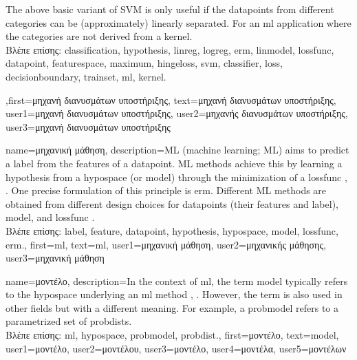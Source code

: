 {{\begin{figure}[H]
\begin{center}
				\label{fig_svm_gls_dict}
			\end{center}
		\end{figure}
		The above basic variant of SVM is only useful if the \gls{datapoint}s from different categories can be  
		(approximately) linearly separated. For an \gls{ml} application where the categories are not 
		derived from a \gls{kernel}.\\
		\foreignlanguage{greek}{Βλέπε επίσης:} \gls{classification}, \gls{hypothesis}, \gls{linreg}, \gls{logreg}, \gls{erm}, \gls{linmodel}, \gls{lossfunc}, \gls{datapoint}, \gls{featurespace}, \gls{maximum}, \gls{hingeloss}, \gls{svm}, \gls{classifier}, \gls{loss}, \gls{decisionboundary}, \gls{trainset}, \gls{ml}, \gls{kernel}.
},first={\foreignlanguage{greek}{μηχανή διανυσμάτων υποστήριξης}},
text={\foreignlanguage{greek}{μηχανή διανυσμάτων υποστήριξης}},
user1={\foreignlanguage{greek}{μηχανή διανυσμάτων υποστήριξης}}, %
user2={\foreignlanguage{greek}{μηχανής διανυσμάτων υποστήριξης}}, %
user3={\foreignlanguage{greek}{μηχανή διανυσμάτων υποστήριξης}} %
}

{name={\foreignlanguage{greek}{μηχανική μάθηση}},
	description={ML (machine learning; ML) aims to predict 
	 a \gls{label} from the \gls{feature}s of a \gls{datapoint}. ML methods achieve 
	 this by learning a \gls{hypothesis} from a \gls{hypospace} (or \gls{model}) 
	 through the minimization of a \gls{lossfunc} \cite{MLBasics}, \cite{HastieWainwrightBook}. 
	 One precise formulation of this principle is \gls{erm}. Different ML methods are 
	 obtained from different design choices for \gls{datapoint}s (their \gls{feature}s and \gls{label}), 
	 \gls{model}, and \gls{lossfunc} \cite[Ch. 3]{MLBasics}.\\
	 \foreignlanguage{greek}{Βλέπε επίσης:} \gls{label}, \gls{feature}, \gls{datapoint}, \gls{hypothesis}, \gls{hypospace}, \gls{model}, \gls{lossfunc}, \gls{erm}.},
	first={ml},
	text={ml},
	user1={\foreignlanguage{greek}{μηχανική μάθηση}}, %
	user2={\foreignlanguage{greek}{μηχανικής μάθησης}}, %
	user3={\foreignlanguage{greek}{μηχανική μάθηση}} %
} 

{name={\foreignlanguage{greek}{μοντέλο}}, 
	description={In the context of \gls{ml}, 
		the term model typically refers to the \gls{hypospace} underlying an 
		\gls{ml} method \cite{MLBasics}, \cite{ShalevMLBook}. However, the term is also used in other 
		fields but with a different meaning. For example, a \gls{probmodel} refers to a parametrized 
		set of \gls{probdist}s.\\
		\foreignlanguage{greek}{Βλέπε επίσης:} \gls{ml}, \gls{hypospace}, \gls{probmodel}, \gls{probdist}.},
		first={\foreignlanguage{greek}{μοντέλο}},
		text={model},
		user1={\foreignlanguage{greek}{μοντέλο}}, %
		user2={\foreignlanguage{greek}{μοντέλου}}, %
		user3={\foreignlanguage{greek}{μοντέλο}}, %
		user4={\foreignlanguage{greek}{μοντέλα}}, %
		user5={\foreignlanguage{greek}{μοντέλων}} %
}


